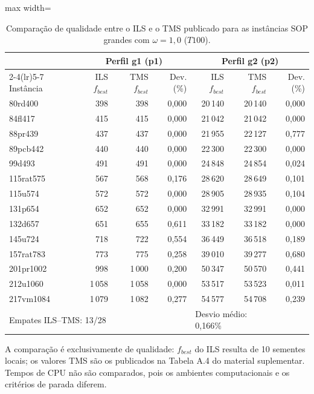 \begin{table}[htbp]
\centering
\scriptsize
\caption{Comparação de qualidade entre o ILS e o TMS publicado para as instâncias SOP grandes com $\omega=1{,}0$ ($T100$).}
\label{tab:ils-tms-sop-large}
\begin{adjustbox}{max width=\textwidth}
\begin{tabular}{lrrr|rrr}
\toprule
& \multicolumn{3}{c}{Perfil g1 (p1)} & \multicolumn{3}{c}{Perfil g2 (p2)} \\
\cmidrule(lr){2-4}\cmidrule(lr){5-7}
Instância & ILS $f_{best}$ & TMS $f_{best}$ & Dev. (\%) & ILS $f_{best}$ & TMS $f_{best}$ & Dev. (\%) \\
\midrule
80rd400 & 398 & 398 & 0{,}000 & 20\,140 & 20\,140 & 0{,}000 \\
84fl417 & 415 & 415 & 0{,}000 & 21\,042 & 21\,042 & 0{,}000 \\
88pr439 & 437 & 437 & 0{,}000 & 21\,955 & 22\,127 & 0{,}777 \\
89pcb442 & 440 & 440 & 0{,}000 & 22\,300 & 22\,300 & 0{,}000 \\
99d493 & 491 & 491 & 0{,}000 & 24\,848 & 24\,854 & 0{,}024 \\
115rat575 & 567 & 568 & 0{,}176 & 28\,620 & 28\,649 & 0{,}101 \\
115u574 & 572 & 572 & 0{,}000 & 28\,905 & 28\,935 & 0{,}104 \\
131p654 & 652 & 652 & 0{,}000 & 32\,991 & 32\,991 & 0{,}000 \\
132d657 & 651 & 655 & 0{,}611 & 33\,182 & 33\,182 & 0{,}000 \\
145u724 & 718 & 722 & 0{,}554 & 36\,449 & 36\,518 & 0{,}189 \\
157rat783 & 773 & 775 & 0{,}258 & 39\,010 & 39\,277 & 0{,}680 \\
201pr1002 & 998 & 1\,000 & 0{,}200 & 50\,347 & 50\,570 & 0{,}441 \\
212u1060 & 1\,058 & 1\,058 & 0{,}000 & 53\,517 & 53\,523 & 0{,}011 \\
217vm1084 & 1\,079 & 1\,082 & 0{,}277 & 54\,577 & 54\,708 & 0{,}239 \\
\midrule
\multicolumn{3}{l}{Empates ILS--TMS: 13/28} & \multicolumn{1}{r}{} & \multicolumn{2}{l}{Desvio médio: 0{,}166\%} & \\
\bottomrule
\end{tabular}
\end{adjustbox}
\begin{minipage}{0.96\linewidth}\footnotesize
A comparação é exclusivamente de qualidade: $f_{best}$ do ILS resulta de 10 sementes locais; os valores TMS são os publicados na Tabela A.4 do material suplementar. Tempos de CPU não são comparados, pois os ambientes computacionais e os critérios de parada diferem.
\end{minipage}
\end{table}

